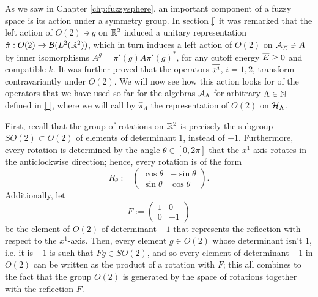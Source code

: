 \lin 

As we saw in Chapter \ref{chp:fuzzysphere}, an important component of a fuzzy space is its action under a symmetry group. In section \ref{} it was remarked that the left action of $O(2) \ni g$ on $\mathbb{R}^2$ induced a unitary representation $\hat \pi: O(2) \to \mathcal B(L^2(\mathbb{R}^2))$, which in turn induces a left action of $O(2)$ on $\mathcal A_{\overline{E}} \ni A$ by inner isomorphisms $A^g = \pi'(g) A \pi'(g)^*$, for any cutoff energy $\overline{E} \geq 0$ and compatible $k$. It was further proved that the operators $\overline{x^i}$, $i = 1, 2$, transform contravariantly under $O(2)$. We will now see how this action looks for of the operators that we have used so far for the algebras $\mathcal A_\Lambda$ for arbitrary $\Lambda \in \mathbb{N}$ defined in \ref{ }, where we will call by $\hat \pi_\Lambda$ the representation of $O(2)$ on $\mathcal H_\Lambda$.%

First, recall that the group of rotations on $\mathbb{R}^2$ is precisely the subgroup $SO(2) \subset O(2)$ of elements of determinant $1$, instead of $-1$. Furthermore, every rotation is determined by the angle $\theta \in [0, 2\pi]$ that the $x^1$-axis rotates in the anticlockwise direction; hence, every rotation is of the form
\begin{equation}\label{equationGEneral2DRotationTheta}
    R_\theta := 
    \begin{pmatrix}
    \cos \theta & -\sin \theta \\
    \sin \theta & \cos \theta
    \end{pmatrix}.
\end{equation}
Additionally, let
\begin{equation}
    F := \begin{pmatrix}
    1 & 0 \\
    0 & -1
    \end{pmatrix}
\end{equation} be the element of $O(2)$ of determinant $-1$ that represents the reflection with respect to the $x^1$-axis. Then, every element $g \in O(2)$ whose determinant isn't $1$, i.e. it is $-1$ is such that $Fg \in SO(2)$, and so every element of determinant $-1$ in $O(2)$ can be written as the product of a rotation with $F$; this all combines to the fact that the group $O(2)$ is generated by the space of rotations together with the reflection $F$.

